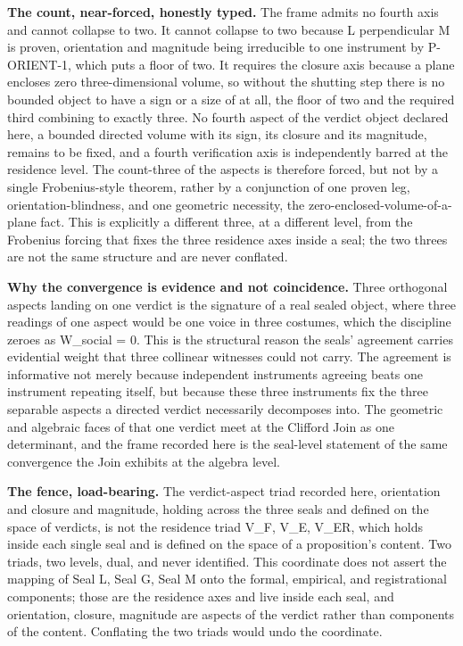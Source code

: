 \documentclass[10pt,twocolumn]{article}
\begin{document}
\textbf{The count, near-forced, honestly typed.} The frame admits no
fourth axis and cannot collapse to two. It cannot collapse to two
because L perpendicular M is proven, orientation and magnitude being
irreducible to one instrument by P-ORIENT-1, which puts a floor of two.
It requires the closure axis because a plane encloses zero
three-dimensional volume, so without the shutting step there is no
bounded object to have a sign or a size of at all, the floor of two and
the required third combining to exactly three. No fourth aspect of the
verdict object declared here, a bounded directed volume with its sign,
its closure and its magnitude, remains to be fixed, and a fourth
verification axis is independently barred at the residence level. The
count-three of the aspects is therefore forced, but not by a single
Frobenius-style theorem, rather by a conjunction of one proven leg,
orientation-blindness, and one geometric necessity, the
zero-enclosed-volume-of-a-plane fact. This is explicitly a different
three, at a different level, from the Frobenius forcing that fixes the
three residence axes inside a seal; the two threes are not the same
structure and are never conflated.

\textbf{Why the convergence is evidence and not coincidence.} Three
orthogonal aspects landing on one verdict is the signature of a real
sealed object, where three readings of one aspect would be one voice in
three costumes, which the discipline zeroes as W\_social = 0. This is
the structural reason the seals' agreement carries evidential weight
that three collinear witnesses could not carry. The agreement is
informative not merely because independent instruments agreeing beats
one instrument repeating itself, but because these three instruments fix
the three separable aspects a directed verdict necessarily decomposes
into. The geometric and algebraic faces of that one verdict meet at the
Clifford Join as one determinant, and the frame recorded here is the
seal-level statement of the same convergence the Join exhibits at the
algebra level.

\textbf{The fence, load-bearing.} The verdict-aspect triad recorded
here, orientation and closure and magnitude, holding across the three
seals and defined on the space of verdicts, is not the residence triad
V\_F, V\_E, V\_ER, which holds inside each single seal and is defined on
the space of a proposition's content. Two triads, two levels, dual, and
never identified. This coordinate does not assert the mapping of Seal L,
Seal G, Seal M onto the formal, empirical, and registrational
components; those are the residence axes and live inside each seal, and
orientation, closure, magnitude are aspects of the verdict rather than
components of the content. Conflating the two triads would undo the
coordinate.
\end{document}
